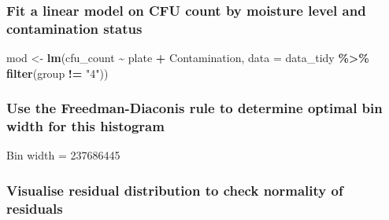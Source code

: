 \documentclass[
]{article}
\newenvironment{Shaded}{\begin{snugshade}}{\end{snugshade}}
\newcommand{\AttributeTok}[1]{\textcolor[rgb]{0.13,0.29,0.53}{#1}}
\newcommand{\DecValTok}[1]{\textcolor[rgb]{0.00,0.00,0.81}{#1}}
\newcommand{\FunctionTok}[1]{\textcolor[rgb]{0.13,0.29,0.53}{\textbf{#1}}}
\newcommand{\NormalTok}[1]{#1}
\newcommand{\OtherTok}[1]{\textcolor[rgb]{0.56,0.35,0.01}{#1}}
\newcommand{\SpecialCharTok}[1]{\textcolor[rgb]{0.81,0.36,0.00}{\textbf{#1}}}
\newcommand{\StringTok}[1]{\textcolor[rgb]{0.31,0.60,0.02}{#1}}
\begin{document}
\subsubsection{Fit a linear model on CFU count by moisture level and
contamination
status}\label{fit-a-linear-model-on-cfu-count-by-moisture-level-and-contamination-status}

\begin{Shaded}
\begin{Highlighting}[]
\NormalTok{mod }\OtherTok{\textless{}{-}} \FunctionTok{lm}\NormalTok{(cfu\_count }\SpecialCharTok{\textasciitilde{}}\NormalTok{ plate }\SpecialCharTok{+}\NormalTok{ Contamination, }\AttributeTok{data =}\NormalTok{ data\_tidy }\SpecialCharTok{\%\textgreater{}\%} \FunctionTok{filter}\NormalTok{(group }\SpecialCharTok{!=} \StringTok{"4"}\NormalTok{))}
\end{Highlighting}
\end{Shaded}

\subsubsection{Use the Freedman-Diaconis rule to determine optimal bin
width for this
histogram}\label{use-the-freedman-diaconis-rule-to-determine-optimal-bin-width-for-this-histogram}

\begin{Shaded}
\end{Shaded}

Bin width = 237686445

\subsubsection{Visualise residual distribution to check normality of
residuals}\label{visualise-residual-distribution-to-check-normality-of-residuals}

\begin{Shaded}
\end{Shaded}
\end{document}
